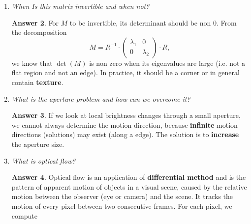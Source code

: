 \documentclass[a4paper,12 pt]{article}
\theoremstyle{definition}
\theoremstyle{remark}
\theoremstyle{definition}
\theoremstyle{definition}
\theoremstyle{definition}
\theoremstyle{definition}
\theoremstyle{remark}
\theoremstyle{remark}
\theoremstyle{definition}
\theoremstyle{definition}
\newtheorem*{answer}{Answer}
\begin{document}
\begin{enumerate}
\begin{enumerate}
\begin{answer}
\begin{equation}
\begin{split}
 \begin{pmatrix}
u\\ v 
 \end{pmatrix}&=\underbrace{\begin{pmatrix}
\sum I_xI_x & \sum I_x I_y\\
\sum I_xI_y & \sum I_y I_y
\end{pmatrix}}_{M} ^{-1}\cdot \begin{pmatrix}
 \sum I_x \cdot \Delta I\\
  \sum I_y \cdot \Delta I\\
 \end{pmatrix}
 \end{split}
\end{equation}
These are not matrix products, but pixel-wise products!
\end{answer}
\item \textit{When Is this matrix invertible and when not? }
\begin{answer}
For $M$ to be invertible, its determinant should be non 0. From the decomposition 
\begin{equation}
M=R^{-1}\cdot \begin{pmatrix}
 \lambda_1 &0\\
 0&\lambda_2
 \end{pmatrix}\cdot R,
\end{equation}
we know that $\det(M)$ is non zero when its eigenvalues are large (i.e. not a flat region and not an edge). In practice, it should be a corner or in general contain \textbf{texture}.
\end{answer}
\item \textit{What is the aperture problem and how can we overcome it? }
\begin{answer}
If we look at local brightness changes through a small aperture, we cannot always determine the motion direction, because \textbf{infinite} motion directions (solutions) may exist (along a edge). The solution is to \textbf{increase} the aperture size.
\end{answer}
\item \textit{What is optical flow?}
\begin{answer}
Optical flow is an application of \textbf{differential method} and is the pattern of apparent motion of objects in a visual scene, caused by the relative motion between the observer (eye or camera) and the scene. It tracks the motion of every pixel between two consecutive frames. For each pixel, we compute
\begin{itemize}

\end{itemize}
\end{answer}
\end{enumerate}
\end{enumerate}
\end{document}
